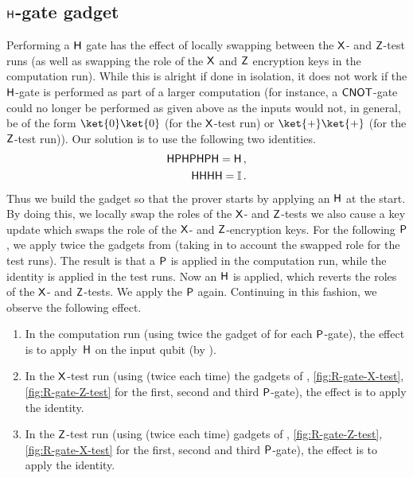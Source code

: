 \documentclass{toc}
\newcommand{\hgate}{{\sf H}}
\newcommand{\pgate}{{\sf P}}
\newcommand{\xgate}{{\sf X}}
\newcommand{\zgate}{{\sf Z}}
\newcommand{\cnot}{{\sf CNOT}}
\begin{document}
\subsection{\texorpdfstring{$\hgate$}{H}-gate gadget}
\label{sec:H-gadget}

Performing a $\hgate$ gate has the effect of locally swapping between the $\xgate$- and $\zgate$-test runs (as well as swapping the role of the $\xgate$ and $\zgate$ encryption keys in the computation run).  While this is alright if done in isolation, it does not work if the $\hgate$-gate is performed as part of a larger computation (for instance, a $\cnot$-gate could no longer be performed as given above as the inputs would not, in general, be of the form $\ket{0}\ket{0}$ (for the $\xgate$-test run) or $\ket{+}\ket{+}$ (for the $\zgate$-test run)). Our solution is to use the following two
identities. %
%
\begin{align} \label{eqn:HPHPHPH}
 \hgate \pgate \hgate \pgate \hgate \pgate \hgate = \hgate\,,\\
%
%
 \hgate \hgate \hgate \hgate = \mathbb{I}\,.
 \end{align}
Thus we build the gadget so that the prover starts by applying an $\hgate$ at the start. By doing this,  we locally swap the roles of the $\xgate$- and $\zgate$-tests we also cause a key update which swaps the role of the $\xgate$- and $\zgate$-encryption keys. For the following $\pgate$, we apply twice the gadgets from   (taking in to account the swapped role for the test runs). The result is that a $\pgate$ is applied in the computation run, while the identity is applied in the test runs. Now an $\hgate$ is applied, which reverts the roles of the $\xgate$- and $\zgate$-tests. We apply the $\pgate$ again. Continuing in this fashion,
%
we observe the following effect.  %
\begin{enumerate}
\item In the computation run (using twice the gadget of  for each $\pgate$-gate), the effect is to apply~$\hgate$ on the input qubit (by ).
\item In the $\xgate$-test run (using (twice each time) the gadgets of ,   \ref{fig:R-gate-X-test},  \ref{fig:R-gate-Z-test} for the first, second and third $\pgate$-gate), the effect is to apply the identity.
\item In the $\zgate$-test run (using (twice each time) gadgets of ,   \ref{fig:R-gate-Z-test},  \ref{fig:R-gate-X-test} for the first, second and third $\pgate$-gate), the effect is to apply the identity.
\end{enumerate}
\end{document}
